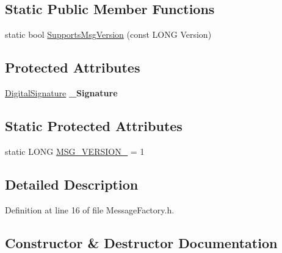 \subsection*{Static Public Member Functions}
\begin{DoxyCompactItemize}
\item 
static bool \hyperlink{class_canberra_1_1_data_types_1_1_serialization_1_1_message_factory_a65f9fac8fd218160a684f52d72fadb94_a65f9fac8fd218160a684f52d72fadb94}{Supports\+Msg\+Version} (const L\+O\+NG Version)
\end{DoxyCompactItemize}
\subsection*{Protected Attributes}
\begin{DoxyCompactItemize}
\item 
\mbox{\label{class_canberra_1_1_data_types_1_1_serialization_1_1_message_factory_a57b5383123964bfe08aa9253805e9cba}} 
\hyperlink{class_canberra_1_1_data_types_1_1_serialization_1_1_digital_signature}{Digital\+Signature} {\bfseries \+\_\+\+Signature}
\end{DoxyCompactItemize}
\subsection*{Static Protected Attributes}
\begin{DoxyCompactItemize}
\item 
static L\+O\+NG \hyperlink{class_canberra_1_1_data_types_1_1_serialization_1_1_message_factory_ae6f7663a578514f13d57031c407077ce_ae6f7663a578514f13d57031c407077ce}{M\+S\+G\+\_\+\+V\+E\+R\+S\+I\+O\+N\+\_} = 1
\end{DoxyCompactItemize}


\subsection{Detailed Description}


Definition at line 16 of file Message\+Factory.\+h.



\subsection{Constructor \& Destructor Documentation}
\mbox{\label{class_canberra_1_1_data_types_1_1_serialization_1_1_message_factory_a5def241bfd7f4c6138bca7b883420494_a5def241bfd7f4c6138bca7b883420494}} 
